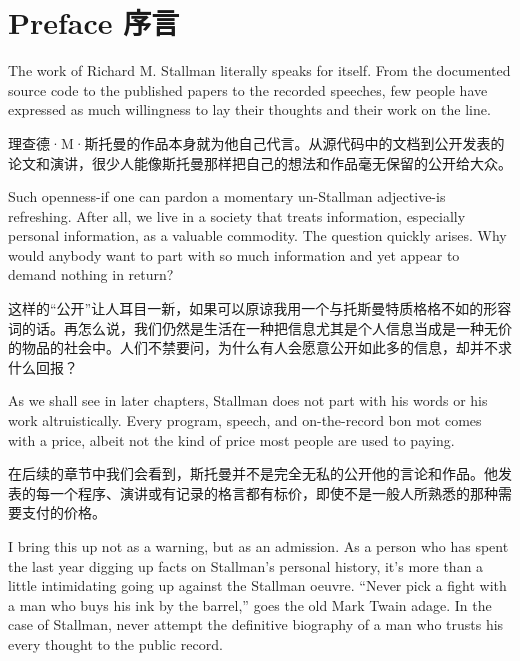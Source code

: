 \chapter{\ifdefined\eng
Preface
\fi
\ifdefined\chs
序言
\fi}

\ifdefined\eng
The work of Richard M. Stallman literally speaks for itself. From the documented source code to the published papers to the recorded speeches, few people have expressed as much willingness to lay their thoughts and their work on the line.
\fi

\ifdefined\chs
理查德·M·斯托曼的作品本身就为他自己代言。从源代码中的文档到公开发表的论文和演讲，很少人能像斯托曼那样把自己的想法和作品毫无保留的公开给大众。
\fi

\ifdefined\eng
Such openness-if one can pardon a momentary un-Stallman adjective-is refreshing. After all, we live in a society that treats information, especially personal information, as a valuable commodity. The question quickly arises. Why would anybody want to part with so much information and yet appear to demand nothing in return?
\fi

\ifdefined\chs
这样的``公开''让人耳目一新，如果可以原谅我用一个与托斯曼特质格格不如的形容词的话。再怎么说，我们仍然是生活在一种把信息尤其是个人信息当成是一种无价的物品的社会中。人们不禁要问，为什么有人会愿意公开如此多的信息，却并不求什么回报？
\fi

\ifdefined\eng
As we shall see in later chapters, Stallman does not part with his words or his work altruistically. Every program, speech, and on-the-record bon mot comes with a price, albeit not the kind of price most people are used to paying.
\fi

\ifdefined\chs
在后续的章节中我们会看到，斯托曼并不是完全无私的公开他的言论和作品。他发表的每一个程序、演讲或有记录的格言都有标价，即使不是一般人所熟悉的那种需要支付的价格。
\fi

\ifdefined\eng
I bring this up not as a warning, but as an admission. As a person who has spent the last year digging up facts on Stallman's personal history, it's more than a little intimidating going up against the Stallman oeuvre. ``Never pick a fight with a man who buys his ink by the barrel,'' goes the old Mark Twain adage. In the case of Stallman, never attempt the definitive biography of a man who trusts his every thought to the public record.
\fi

